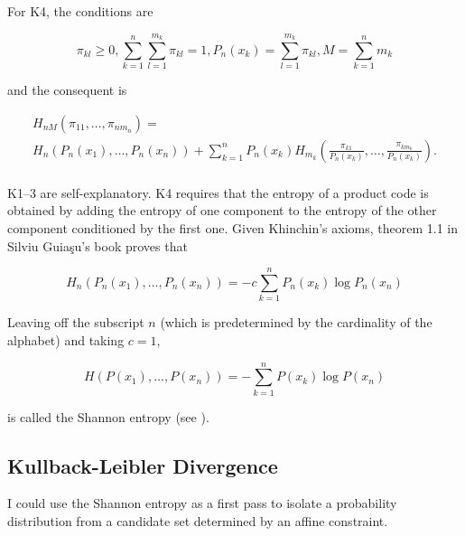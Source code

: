 \documentclass[phd,12pt,oneside]{ubcthesis}
\begin{document}
{\noindent}For K4, the conditions are

\begin{equation}
  \label{eq:oupiahel}
  \pi_{kl}\geq{}0,\sum_{k=1}^{n}\sum_{l=1}^{m_{k}}\pi_{kl}=1,P_{n}(x_{k})=\sum_{l=1}^{m_{k}}\pi_{kl},M=\sum_{k=1}^{n}m_{k}
\end{equation}

{\noindent}and the consequent is

\begin{equation}
  \label{eq:oothaedo}
  \begin{array}{l}
    \displaystyle H_{nM}(\pi_{11},\ldots,\pi_{nm_{n}})= \\
    \displaystyle H_{n}(P_{n}(x_{1}),\ldots,P_{n}(x_{n}))+\sum_{k=1}^{n}P_{n}(x_{k})H_{m_{k}}\left(\frac{\pi_{k1}}{P_{n}(x_{k})},\ldots,\frac{\pi_{km_{k}}}{P_{n}(x_{k})}\right). \\
  \end{array}
\end{equation}

K1--3 are self-explanatory. K4 requires that the entropy of a product
code is obtained by adding the entropy of one component to the entropy
of the other component conditioned by the first one. Given Khinchin's
axioms, theorem 1.1 in Silviu Guia{\c{s}}u's book proves that 

\begin{equation}
  \label{eq:kualiaku}
  H_{n}(P_{n}(x_{1}),\ldots,P_{n}(x_{n}))=-c\sum_{k=1}^{n}P_{n}(x_{k})\log{}P_{n}(x_{n})
\end{equation}

{\noindent}Leaving off the subscript $n$ (which is predetermined by the
cardinality of the alphabet) and taking $c=1$, 

\begin{equation}
  \label{eq:oowoongu}
  H(P(x_{1}),\ldots,P(x_{n}))=-\sum_{k=1}^{n}P(x_{k})\log{}P(x_{n})
\end{equation}

{\noindent}is called the Shannon entropy (see ).

\subsection{Kullback-Leibler Divergence}
\label{subsec:sihaivei}

I could use the Shannon entropy as a first pass to isolate a
probability distribution from a candidate set determined by an affine
constraint.
\end{document}
